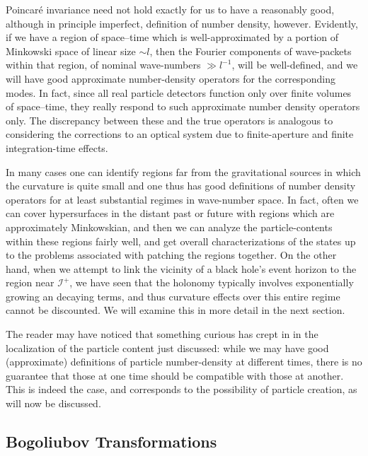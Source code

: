 \documentclass[12pt]{article}
\newcommand{\scrif}{{{\mathscr I}^{+}}}
\begin{document}
Poincar\'e invariance need not hold exactly for us to have a reasonably good, although in principle imperfect, definition of number density, however.  Evidently, if we have a region of space--time which is well-approximated by a portion of Minkowski space of linear size $\sim l$, then the Fourier components of wave-packets within that region, of nominal wave-numbers $\gg l^{-1}$, will be well-defined, and we will have good approximate number-density operators for the corresponding modes.  In fact, since all real particle detectors function only over finite volumes of space--time, they really respond to such approximate number density operators only.  The discrepancy between these and the true operators is analogous to considering the corrections to an optical system due to finite-aperture and finite integration-time effects.

In many cases one can identify regions far from the gravitational sources in which the curvature is quite small and one thus has good definitions of number density operators for at least substantial regimes in wave-number space.  In fact, often we can cover hypersurfaces in the distant past or future with regions which are approximately Minkowskian, and then we can analyze the particle-contents within these regions fairly well, and get overall characterizations of the states up to the problems associated with patching the regions together.
On the other hand, when we attempt to link the vicinity of a black hole's event horizon to the region near $\scrif$, we have seen that the holonomy typically involves exponentially growing an decaying terms, and thus curvature effects over this entire regime cannot be discounted.  We will examine this in more detail in the next section.

The reader may have noticed that something curious has crept in in the localization of the particle content just discussed:  while we may have good (approximate) definitions of particle number-density at different times, there is no guarantee that those at one time should be compatible with those at another.  This is indeed the case, and corresponds to the possibility of particle creation, as will now be discussed.

\subsection{Bogoliubov Transformations}\label{BTsec}
\end{document}
